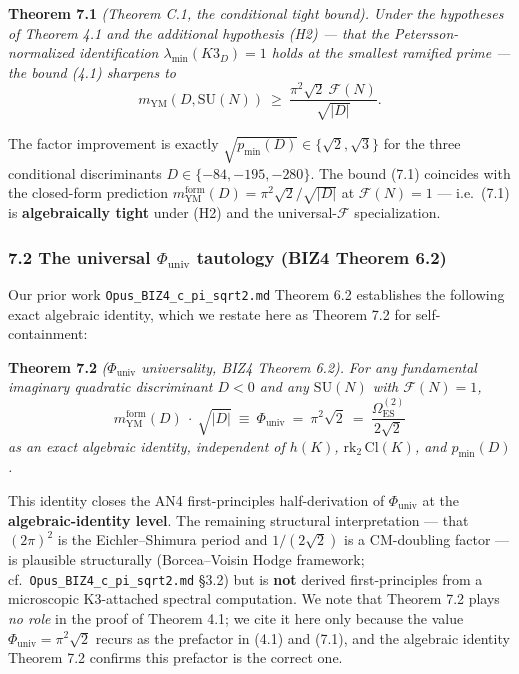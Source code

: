 \documentclass[
  11pt,
  a4paper,
]{amsart}
\begin{document}
\textbf{Theorem 7.1} \emph{(Theorem C.1, the conditional tight bound).} \emph{Under the hypotheses of Theorem 4.1 and the additional hypothesis (H2) --- that the Petersson-normalized identification \(\lambda_{\min}(K3_D) = 1\) holds at the smallest ramified prime --- the bound (4.1) sharpens to}
\[
m_{\mathrm{YM}}(D, \mathrm{SU}(N))\ \ge\ \frac{\pi^2 \sqrt{2}\ \mathcal{F}(N)}{\sqrt{|D|}}.
\tag{7.1}
\]

The factor improvement is exactly \(\sqrt{p_{\min}(D)} \in \{\sqrt{2}, \sqrt{3}\}\) for the three conditional discriminants \(D \in \{-84, -195, -280\}\). The bound (7.1) coincides with the closed-form prediction \(m_{\mathrm{YM}}^{\mathrm{form}}(D) = \pi^2 \sqrt{2} / \sqrt{|D|}\) at \(\mathcal{F}(N) = 1\) --- i.e.~(7.1) is \textbf{algebraically tight} under (H2) and the universal-\(\mathcal{F}\) specialization.

\hypertarget{the-universal-phi_mathrmuniv-tautology-biz4-theorem-6.2}{%
\subsubsection{\texorpdfstring{7.2 The universal \(\Phi_{\mathrm{univ}}\) tautology (BIZ4 Theorem 6.2)}{7.2 The universal \textbackslash Phi\_\{\textbackslash mathrm\{univ\}\} tautology (BIZ4 Theorem 6.2)}}\label{the-universal-phi_mathrmuniv-tautology-biz4-theorem-6.2}}

Our prior work \texttt{Opus\_BIZ4\_c\_pi\_sqrt2.md} Theorem 6.2 establishes the following exact algebraic identity, which we restate here as Theorem 7.2 for self-containment:

\textbf{Theorem 7.2} \emph{(\(\Phi_{\mathrm{univ}}\) universality, BIZ4 Theorem 6.2).} \emph{For any fundamental imaginary quadratic discriminant \(D < 0\) and any \(\mathrm{SU}(N)\) with \(\mathcal{F}(N) = 1\),}
\[
m_{\mathrm{YM}}^{\mathrm{form}}(D)\ \cdot\ \sqrt{|D|}\ \equiv\ \Phi_{\mathrm{univ}}\ =\ \pi^2 \sqrt{2}\ =\ \frac{\Omega_{\mathrm{ES}}^{(2)}}{2 \sqrt{2}}
\]
\emph{as an exact algebraic identity, independent of \(h(K)\), \(\mathrm{rk}_2\, \mathrm{Cl}(K)\), and \(p_{\min}(D)\).}

This identity closes the AN4 first-principles half-derivation of \(\Phi_{\mathrm{univ}}\) at the \textbf{algebraic-identity level}. The remaining structural interpretation --- that \((2\pi)^2\) is the Eichler--Shimura period and \(1/(2\sqrt{2})\) is a CM-doubling factor --- is plausible structurally (Borcea--Voisin Hodge framework; cf.~\texttt{Opus\_BIZ4\_c\_pi\_sqrt2.md} §3.2) but is \textbf{not} derived first-principles from a microscopic K3-attached spectral computation. We note that Theorem 7.2 plays \emph{no role} in the proof of Theorem 4.1; we cite it here only because the value \(\Phi_{\mathrm{univ}} = \pi^2 \sqrt{2}\) recurs as the prefactor in (4.1) and (7.1), and the algebraic identity Theorem 7.2 confirms this prefactor is the correct one.
\end{document}
